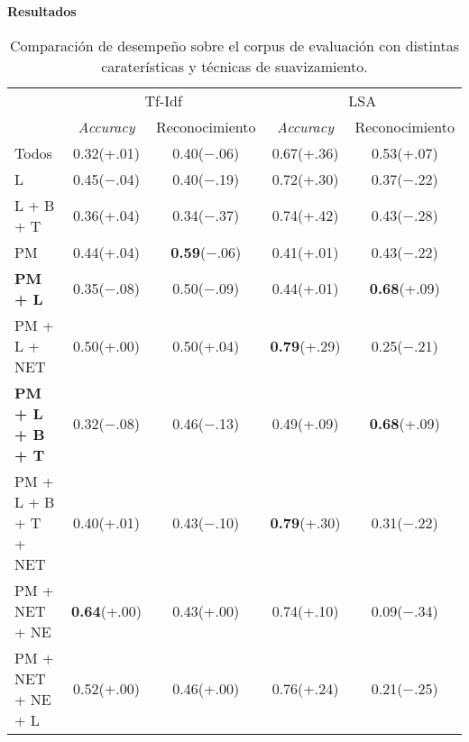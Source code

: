 \vspace{3 mm}
\textbf{Resultados}

\begin{table}[h]
\centering
\begin{tabular}{l c c | c c}
     & \multicolumn{2}{c|}{Tf-Idf} & \multicolumn{2}{c}{LSA}\\ [0.5ex]
     & \textit{Accuracy} & Reconocimiento & \textit{Accuracy} & Reconocimiento \\ [0.5ex]
    \hline
    Todos & 0.32(+.01) & 0.40($-$.06) & 0.67(+.36) & 0.53(+.07) \\[0.5ex]
    L & 0.45($-$.04) & 0.40($-$.19) & 0.72(+.30) & 0.37($-$.22) \\[0.5ex]
    L + B + T & 0.36(+.04) & 0.34($-$.37) & 0.74(+.42) & 0.43($-$.28) \\[0.5ex]
    PM & 0.44(+.04) & \textbf{0.59}($-$.06) & 0.41(+.01) & 0.43($-$.22) \\[0.5ex]
    \textbf{PM + L} & 0.35($-$.08) & 0.50($-$.09) & 0.44(+.01) & \textbf{0.68}(+.09) \\[0.5ex]
    PM + L + NET & 0.50(+.00) & 0.50(+.04) & \textbf{0.79}(+.29) & 0.25($-$.21)\\[0.5ex]
    \textbf{PM + L + B + T} & 0.32($-$.08) & 0.46($-$.13) & 0.49(+.09) & \textbf{0.68}(+.09) \\[0.5ex]
    PM + L + B + T + NET & 0.40(+.01) & 0.43($-$.10) & \textbf{0.79}(+.30) & 0.31($-$.22) \\[0.5ex]
    PM + NET + NE & \textbf{0.64}(+.00) & 0.43(+.00) & 0.74(+.10) & 0.09($-$.34) \\[0.5ex]
    PM + NET + NE + L & 0.52(+.00) & 0.46(+.00) & 0.76(+.24) & 0.21($-$.25) \\[0.5ex]
    \hline
\end{tabular}
\caption{Comparación de desempeño sobre el corpus de evaluación con distintas caraterísticas y técnicas de suavizamiento.}\label{tabla-exp4}
\end{table}

